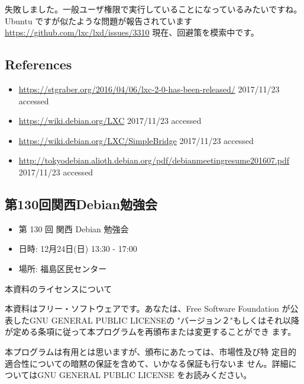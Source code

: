 \documentclass[mingoth,a4paper]{jsarticle}
\begin{document}
失敗しました。一般ユーザ権限で実行していることになっているみたいですね。
Ubuntu ですが似たような問題が報告されています \url{https://github.com/lxc/lxd/issues/3310}
現在、回避策を模索中です。

\subsection{References}
\begin{itemize}
\item \url{https://stgraber.org/2016/04/06/lxc-2-0-has-been-released/} 2017/11/23 accessed 
\item \url{https://wiki.debian.org/LXC} 2017/11/23 accessed 
\item \url{https://wiki.debian.org/LXC/SimpleBridge} 2017/11/23 accessed 
\item \url{http://tokyodebian.alioth.debian.org/pdf/debianmeetingresume201607.pdf} 2017/11/23 accessed 
\end{itemize}



\subsection{第130回関西Debian勉強会}
\begin{itemize}
\item 第 130 回 関西 Debian 勉強会 
\item 日時: 12月24日(日) 13:30 - 17:00
\item 場所: 福島区民センター
\end{itemize}


\pagebreak

\begin{center}
本資料のライセンスについて
\end{center}

本資料はフリー・ソフトウェアです。あなたは、Free Software
Foundation が公表したGNU GENERAL PUBLIC LICENSEの "バージョン２"もしくはそれ以降
が定める条項に従って本プログラムを再頒布または変更することができ
ます。

本プログラムは有用とは思いますが、頒布にあたっては、市場性及び特
定目的適合性についての暗黙の保証を含めて、いかなる保証も行ないま
せん。詳細についてはGNU GENERAL PUBLIC LICENSE をお読みください。
\end{document}
